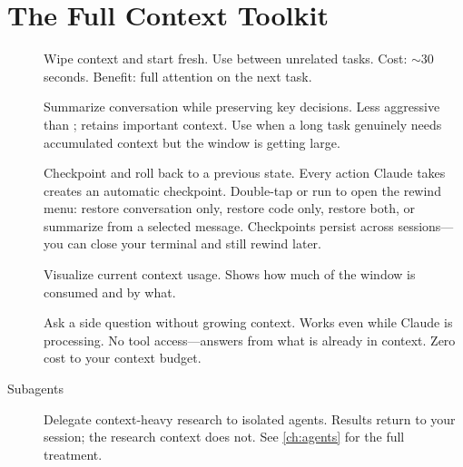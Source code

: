 

\section{The Full Context Toolkit}
\label{sec:context-toolkit}

\begin{description}
  \item[] Wipe context and start fresh. Use between unrelated tasks.
    Cost: $\sim$30 seconds. Benefit: full attention on the next task.

  \item[] Summarize conversation while preserving key decisions.
    Less aggressive than ; retains important context.
    Use when a long task genuinely needs accumulated context but the
    window is getting large.

  \item[] Checkpoint and roll back to a previous state.
    Every action Claude takes creates an automatic checkpoint.
    Double-tap  or run  to open the rewind menu:
    restore conversation only, restore code only, restore both,
    or summarize from a selected message.
    Checkpoints persist across sessions---you can close your terminal
    and still rewind later.

  \item[] Visualize current context usage.
    Shows how much of the window is consumed and by what.

  \item[] Ask a side question without growing context.
    Works even while Claude is processing. No tool access---answers from
    what is already in context. Zero cost to your context budget.

  \item[Subagents] Delegate context-heavy research to isolated agents.
    Results return to your session; the research context does not.
    See \cref{ch:agents} for the full treatment.
\end{description}

